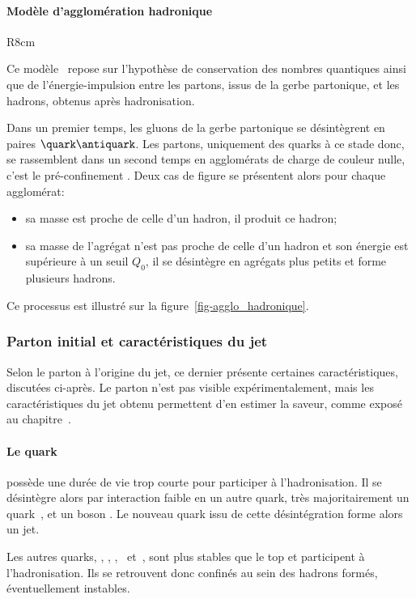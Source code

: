 \paragraph{Modèle d'agglomération hadronique}\label{chapter-MSSM-formation_jets-subsec-hadronisation-subsubsec-agglo_hadronique}
\begin{wrapfigure}{R}{8cm}
\centering

\caption[Formation de jets dans le cadre du modèle d'agglomération hadronique.]{Schématisation de l'hadronisation dans le cadre du modèle d'agglomération hadronique.}
\label{fig-agglo_hadronique}
\end{wrapfigure}
Ce modèle~\cite{Winter_2004} repose sur l'hypothèse de conservation des nombres quantiques ainsi que de l'énergie-impulsion entre les partons, issus de la gerbe partonique, et les hadrons, obtenus après hadronisation.
\par Dans un premier temps, les gluons de la gerbe partonique se désintègrent en paires $\quark\antiquark$. Les partons, uniquement des quarks à ce stade donc, se rassemblent dans un second temps en agglomérats de charge de couleur nulle, c'est le \og pré-confinement \fg.
Deux cas de figure se présentent alors pour chaque agglomérat:
\begin{itemize}
\item sa masse est proche de celle d'un hadron, il produit ce hadron;
\item sa masse de l'agrégat n'est pas proche de celle d'un hadron et son énergie est supérieure à un seuil $Q_0$, il se désintègre en agrégats plus petits et forme plusieurs hadrons.
\end{itemize}
Ce processus est illustré sur la figure~\ref{fig-agglo_hadronique}.

\subsubsection{Parton initial et caractéristiques du jet}
Selon le parton à l'origine du jet, ce dernier présente certaines caractéristiques, discutées ci-après.
Le parton n'est pas visible expérimentalement, mais les caractéristiques du jet obtenu permettent d'en estimer la saveur, comme exposé au chapitre~.
\paragraph{Le quark~\quarkt} possède une durée de vie trop courte pour participer à l'hadronisation. Il se désintègre alors par interaction faible en un autre quark, très majoritairement un quark~\quarkb, et un boson \Wboson. Le nouveau quark issu de cette désintégration forme alors un jet.
\par Les autres quarks, \quarkd, \quarku, \quarks, \quarkc\ et~\quarkb, sont plus stables que le top et participent à l'hadronisation.
Ils se retrouvent donc confinés au sein des hadrons formés, éventuellement instables.
